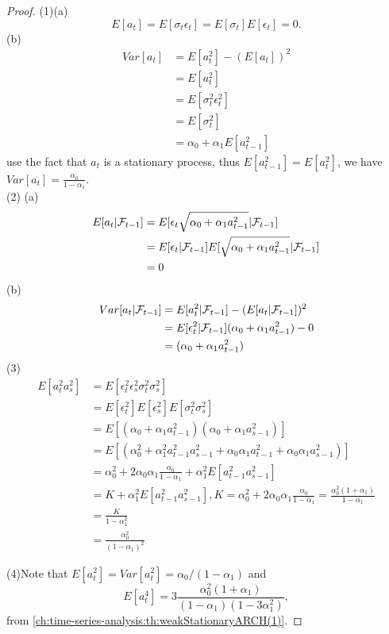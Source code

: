 \begin{proof}
(1)(a) $$E[a_t] = E[\sigma_t\epsilon_t]=E[\sigma_t]E[\epsilon_t] = 0.$$
(b) \begin{align*}
Var[a_t] &= E[a_t^2] - (E[a_t])^2\\
&=E[a_t^2] \\
&=E[\sigma_t^2\epsilon_t^2]\\
&=E[\sigma_t^2]\\
&=\alpha_0 + \alpha_1E[a_{t-1}^2]
\end{align*}
use the fact that $a_t$ is a stationary process, thus $E[a_{t-1}^2] = E[a_t^2]$, we have $Var[a_t] = \frac{\alpha_0}{1-\alpha_1}$.\\
(2)
(a)
\begin{align*}
E[a_t|\mathcal{F}_{t-1}] &= E[\epsilon_{t}\sqrt{\alpha_0 + \alpha_1 a_{t-1}^2}|\mathcal{F}_{t-1}] \\
&= E[\epsilon_t|\mathcal{F}_{t-1}]E[\sqrt{\alpha_0 + \alpha_1 a_{t-1}^2}|\mathcal{F}_{t-1}] \\
&= 0
\end{align*}
(b)
\begin{align*}
Var[a_t|\mathcal{F}_{t-1}] &= E[a_t^2|\mathcal{F}_{t-1}] - (E[a_t|\mathcal{F}_{t-1}])^2 \\
&= E[\epsilon_t^2|\mathcal{F}_{t-1}](\alpha_0 + \alpha_1 a_{t-1}^2) - 0 \\
&= (\alpha_0 + \alpha_1 a_{t-1}^2)
\end{align*}
(3)
\begin{align*}
E[a_t^2a_s^2] &= E[\epsilon_t^2\epsilon_s^2\sigma_t^2\sigma_s^2] \\
&= E[\epsilon_t^2]E[\epsilon_s^2]E[\sigma_t^2\sigma_s^2] \\
&=E[(\alpha_0 + \alpha_1 a_{t-1}^2)(\alpha_0 + \alpha_1 a_{s-1}^2)]\\
&=E[(\alpha_0^2 + \alpha_1^2a_{t-1}^2a_{s-1}^2 + \alpha_0\alpha_1a_{t-1}^2 + \alpha_0\alpha_1a_{s-1}^2)]\\
&=\alpha_0^2 + 2\alpha_0\alpha_1\frac{\alpha_0}{1-\alpha_1} + \alpha_1^2E[a_{t-1}^2a_{s-1}^2] \\
&= K + \alpha_1^2  E[a_{t-1}^2a_{s-1}^2],K = \alpha_0^2 + 2\alpha_0\alpha_1\frac{\alpha_0}{1-\alpha_1} = \frac{\alpha_0^2(1+\alpha_1)}{1-\alpha_1}\\
& = \frac{K}{1-\alpha_1^2} \\
& = \frac{\alpha_0^2}{(1-\alpha_1)^2} 
\end{align*}


(4)Note that $E[a_t^2] = Var[a_t^2] = \alpha_0/(1-\alpha_1)$ and 
 $$E[a_t^4] = 3\frac{\alpha_0^2 (1 + \alpha_1)}{(1-\alpha_1)(1-3\alpha_1^2)},$$
 from \autoref{ch:time-series-analysis:th:weakStationaryARCH(1)}.
\end{proof}

